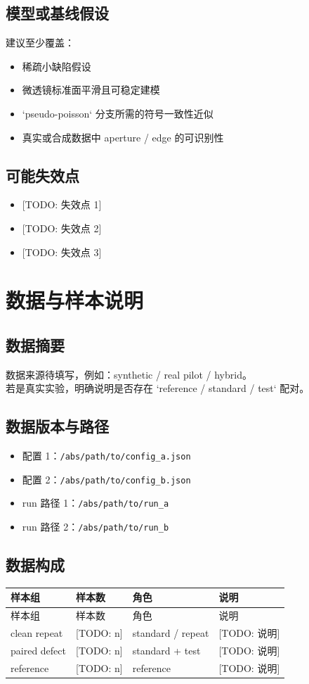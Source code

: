 \documentclass[UTF8,a4paper,11pt]{ctexart}
\newcommand{\DataSummary}{%
数据来源待填写，例如：synthetic / real pilot / hybrid。\\
若是真实实验，明确说明是否存在 `reference / standard / test` 配对。%
}
\newcommand{\PrimaryRunPaths}{%
\begin{itemize}
  \item run 路径 1：\texttt{/abs/path/to/run\_a}
  \item run 路径 2：\texttt{/abs/path/to/run\_b}
\end{itemize}
}
\newcommand{\PrimaryConfigPaths}{%
\begin{itemize}
  \item 配置 1：\texttt{/abs/path/to/config\_a.json}
  \item 配置 2：\texttt{/abs/path/to/config\_b.json}
\end{itemize}
}
\newcommand{\TODO}[1]{\textcolor{red!70!black}{[TODO: #1]}}
\begin{document}
\subsection{模型或基线假设}
建议至少覆盖：
\begin{itemize}
  \item 稀疏小缺陷假设
  \item 微透镜标准面平滑且可稳定建模
  \item `pseudo-poisson` 分支所需的符号一致性近似
  \item 真实或合成数据中 aperture / edge 的可识别性
\end{itemize}

\subsection{可能失效点}
\begin{itemize}
  \item \TODO{失效点 1}
  \item \TODO{失效点 2}
  \item \TODO{失效点 3}
\end{itemize}

\section{数据与样本说明}

\subsection{数据摘要}
\DataSummary

\subsection{数据版本与路径}
\PrimaryConfigPaths
\PrimaryRunPaths

\subsection{数据构成}
\begin{longtable}{p{} p{} p{} p{}}
\toprule
样本组 & 样本数 & 角色 & 说明 \\
\midrule
\endfirsthead
\toprule
样本组 & 样本数 & 角色 & 说明 \\
\midrule
\endhead
clean repeat & \TODO{n} & standard / repeat & \TODO{说明} \\
paired defect & \TODO{n} & standard + test & \TODO{说明} \\
reference & \TODO{n} & reference & \TODO{说明} \\
\bottomrule
\end{longtable}
\end{document}
